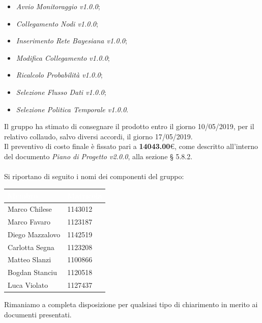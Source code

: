 \documentclass[11pt, a4paper]{letter} %
\begin{document}
\begin{letter}
\begin{itemize}
\begin{itemize}
			\item \textit{Avvio Monitoraggio v1.0.0};
			\item \textit{Collegamento Nodi v1.0.0};
			\item \textit{Inserimento Rete Bayesiana v1.0.0};
			\item \textit{Modifica Collegamento v1.0.0};
			\item \textit{Ricalcolo Probabilità v1.0.0};
			\item \textit{Selezione Flusso Dati v1.0.0};
			\item \textit{Selezione Politica Temporale v1.0.0}.
		\end{itemize}
		\end{itemize}
		Il gruppo ha stimato di consegnare il prodotto entro il giorno 10/05/2019, per il relativo collaudo, salvo diversi accordi, il giorno 17/05/2019.\\  
		Il preventivo di costo finale è fissato pari a \textbf{14043.00}€, come descritto all'interno del documento \textit{Piano di Progetto v2.0.0}, alla sezione § 5.8.2.\\ %
		\-\\
		Si riportano di seguito i nomi dei componenti del gruppo:
		\begin{center}
			\begin{longtable}[c]{|m{}|m{}|} 
				\hline
				\rowcolor{bluelogo}\textbf{\textcolor{white}{Membro}}  & \textbf{\textcolor{white}{Matricola}}\\
				\hline
				Marco Chilese & 1143012\\
				\hline
				\rowcolor{grigio}Marco Favaro & 1123187\\ 
				\hline
				Diego Mazzalovo & 1142519\\
				\hline
				\rowcolor{grigio}Carlotta Segna & 1123208\\
				\hline
				Matteo Slanzi & 1100866\\
				\hline
				\rowcolor{grigio}Bogdan Stanciu  & 1120518\\
				\hline
				Luca Violato & 1127437\\
				\hline
			\end{longtable}
		\end{center}
		
		Rimaniamo a completa disposizione per qualsiasi tipo di chiarimento in merito ai documenti presentati.
		

\end{letter}
\end{document}
